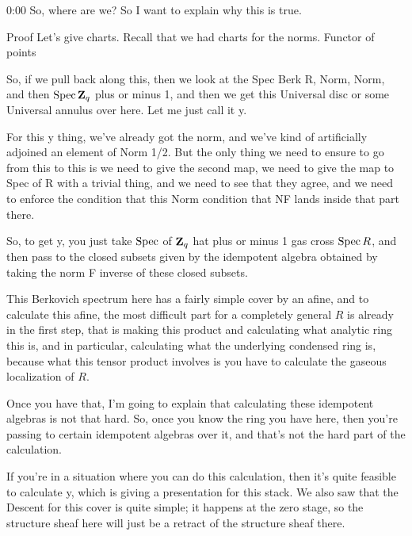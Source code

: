 \begin{unfinished}{0:00}
So, where are we?
So I want to explain why this is true. 

Proof
Let's give charts.
Recall that we had charts for the norms.
Functor of points

So, if we pull back along this, then we look at the Spec Berk R, Norm, Norm, and then $\operatorname{Spec} \mathbf Z_q$ plus or minus 1, and then we get this Universal disc or some Universal annulus over here. Let me just call it y.

For this y thing, we've already got the norm, and we've kind of artificially adjoined an element of Norm 1/2. But the only thing we need to ensure to go from this to this is we need to give the second map, we need to give the map to Spec of R with a trivial thing, and we need to see that they agree, and we need to enforce the condition that this Norm condition that NF lands inside that part there.

So, to get y, you just take $\operatorname{Spec}$ of $\mathbf Z_q$ hat plus or minus 1 gas cross $\operatorname{Spec} R$, and then pass to the closed subsets given by the idempotent algebra obtained by taking the norm F inverse of these closed subsets.

This Berkovich spectrum here has a fairly simple cover by an afine, and to calculate this afine, the most difficult part for a completely general $R$ is already in the first step, that is making this product and calculating what analytic ring this is, and in particular, calculating what the underlying condensed ring is, because what this tensor product involves is you have to calculate the gaseous localization of $R$.

Once you have that, I'm going to explain that calculating these idempotent algebras is not that hard. So, once you know the ring you have here, then you're passing to certain idempotent algebras over it, and that's not the hard part of the calculation.

If you're in a situation where you can do this calculation, then it's quite feasible to calculate y, which is giving a presentation for this stack. We also saw that the Descent for this cover is quite simple; it happens at the zero stage, so the structure sheaf here will just be a retract of the structure sheaf there.


\end{unfinished}
